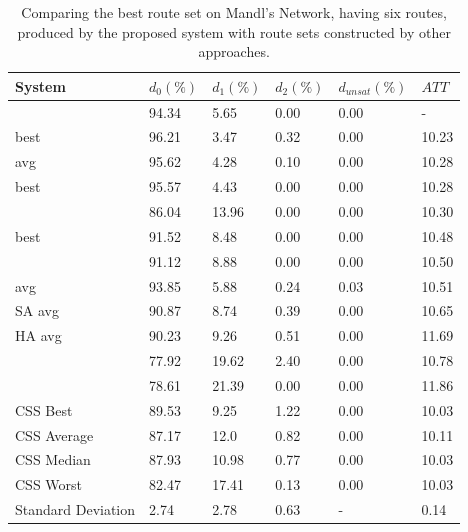 \begin{table}[H]
    \centering
    \hspace*{-1.0cm}
    \begin{tabular}{|l|l|l|l|l|l|}
    \hline
    \textbf{System} & $d_0(\%)$ & $d_1(\%)$ & $d_2(\%)$ & $d_{unsat}(\%)$ & $ATT$ \\
    \hline
    \citet{nikolic14} & 94.34 & 5.65 & 0.00 & 0.00 & - \\
    \citet{kechagiopoulos14} best & 96.21 & 3.47 & 0.32 & 0.00 & 10.23 \\
    \citet{kechagiopoulos14} avg & 95.62 & 4.28 & 0.10 & 0.00 & 10.28 \\
    \citet{chew12} best & 95.57 & 4.43 & 0.00 & 0.00 & 10.28 \\
    \citet{chakroborty02} & 86.04 & 13.96 & 0.00 & 0.00 & 10.30 \\
    \citet{fan10} best & 91.52 & 8.48 & 0.00 & 0.00 & 10.48  \\
    \citet{zhang10} & 91.12 & 8.88 & 0.00 & 0.00 & 10.50 \\
    \citet{chew12} avg & 93.85 & 5.88 & 0.24 & 0.03 & 10.51 \\
    \citet{fan10} SA avg & 90.87 & 8.74 & 0.39 & 0.00 & 10.65 \\
    \citet{fan10} HA avg & 90.23 & 9.26 & 0.51 & 0.00 & 11.69 \\
    \citet{kidwai98} & 77.92 & 19.62 & 2.40 & 0.00 & 10.78 \\
    \citet{baaj91} & 78.61 & 21.39 & 0.00 & 0.00 & 11.86 \\
    \hline
    CSS Best & 89.53 & 9.25 & 1.22 & 0.00 & 10.03\\
    CSS Average & 87.17 & 12.0 & 0.82 & 0.00 & 10.11\\
    CSS Median & 87.93 & 10.98 & 0.77 & 0.00 & 10.03\\
    CSS Worst & 82.47 & 17.41 & 0.13 & 0.00 & 10.03\\
    Standard Deviation & 2.74 & 2.78 & 0.63 & - & 0.14\\
    \hline
    \end{tabular}
    \caption {Comparing the best route set on Mandl's Network, having six routes, produced by the proposed system with route sets constructed by other approaches.}
    \label{table:performanceComparison_6}
\end{table}


